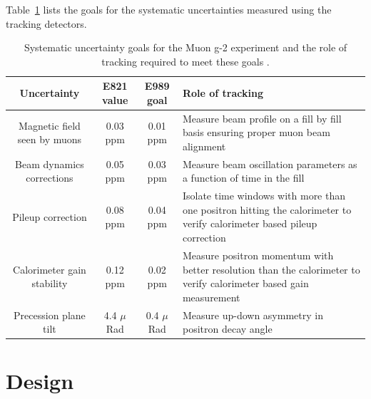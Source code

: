 Table~\ref{table:tracker_syst} lists the goals for the systematic uncertainties measured using the tracking detectors.

\begin{table}[h!]
\begin{center}
 \begin{tabular}{||c | c | c | m{3.5cm}||} 
 \hline
 Uncertainty & E821 value & E989 goal & Role of tracking \\ [0.5ex] 
 \hline\hline
 Magnetic field seen by muons & 0.03 ppm & 0.01 ppm
 & Measure beam profile on a fill by fill basis ensuring proper muon beam alignment \\ 
 \hline
 Beam dynamics corrections & 0.05 ppm & 0.03 ppm & Measure beam oscillation parameters as a function of time in the fill \\
 \hline
 Pileup correction & 0.08 ppm & 0.04 ppm & Isolate time windows with more than one positron hitting the calorimeter to verify calorimeter based pileup correction \\
 \hline
 Calorimeter gain stability & 0.12 ppm & 0.02 ppm & Measure positron momentum with better resolution than the calorimeter to verify calorimeter based gain measurement \\
 \hline
 Precession plane tilt & 4.4 $\mu$Rad & 0.4 $\mu$Rad & Measure up-down asymmetry in positron decay angle \\ [1ex] 
 \hline
\end{tabular}
\caption{Systematic uncertainty goals for the Muon g-2 experiment and the role of tracking required to meet these goals \cite{Reference29}.}
\label{table:tracker_syst}
\end{center}
\end{table}

\section{Design}

